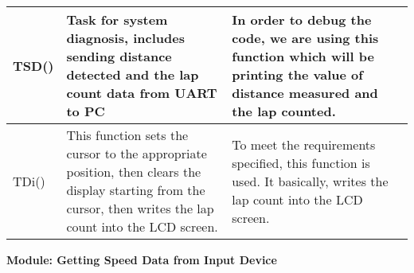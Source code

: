 \documentclass{article}
\begin{document}
\begin{tabular}{| C{4cm} | C{4cm} | C{4cm} | C{2cm} |}
\hline
TSD()&Task for system diagnosis, includes sending distance detected and the lap count data from UART
to PC & In order to debug the code, we are using this function which will be printing the value of
distance measured and the lap counted.&\\
\hline
TDi()&This function sets the cursor to the appropriate position, then clears the display starting from the
cursor, then writes the lap count into the LCD screen.& To meet the requirements specified,
this function is used. It basically, writes the lap count into the LCD screen.&\\
\hline
\end{tabular}
{\huge\textbf {Module: Getting Speed Data from Input Device}}
\end{document}
